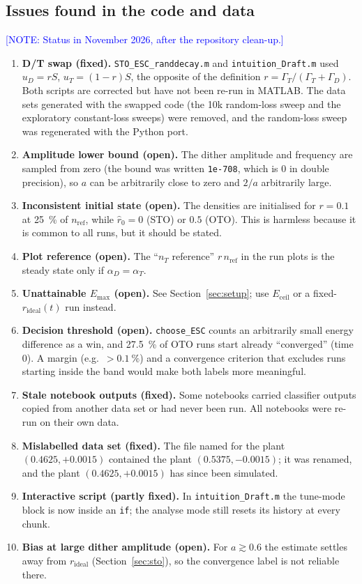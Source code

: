 \documentclass[11pt,a4paper]{article}
\newcommand{\note}[1]{\textcolor{blue}{[NOTE: #1]}}
\newcommand{\nT}{n_T}
\newcommand{\nref}{n_\mathrm{ref}}
\newcommand{\rid}{r_\mathrm{ideal}}
\newcommand{\rhat}{\hat r}
\begin{document}
\subsection{Issues found in the code and data}
\label{sec:issues}
\note{Status in November 2026, after the repository clean-up.}
\begin{enumerate}
  \item \textbf{D/T swap (fixed).} \texttt{STO\_ESC\_randdecay.m} and \texttt{intuition\_Draft.m} used $u_D=rS$, $u_T=(1-r)S$, the opposite of the definition $r=\Gamma_T/(\Gamma_T+\Gamma_D)$. Both scripts are corrected but have not been re-run in MATLAB. The data sets generated with the swapped code (the 10k random-loss sweep and the exploratory constant-loss sweeps) were removed, and the random-loss sweep was regenerated with the Python port.
  \item \textbf{Amplitude lower bound (open).} The dither amplitude and frequency are sampled from zero (the bound was written \texttt{1e-708}, which is $0$ in double precision), so $a$ can be arbitrarily close to zero and $2/a$ arbitrarily large.
  \item \textbf{Inconsistent initial state (open).} The densities are initialised for $r=0.1$ at \SI{25}{\percent} of $\nref$, while $\rhat_0=0$ (STO) or $0.5$ (OTO). This is harmless because it is common to all runs, but it should be stated.
  \item \textbf{Plot reference (open).} The ``$\nT$ reference'' $r\,\nref$ in the run plots is the steady state only if $\alpha_D=\alpha_T$.
  \item \textbf{Unattainable $E_\mathrm{max}$ (open).} See Section~\ref{sec:setup}; use $E_\mathrm{ceil}$ or a fixed-$\rid(t)$ run instead.
  \item \textbf{Decision threshold (open).} \texttt{choose\_ESC} counts an arbitrarily small energy difference as a win, and \SI{27.5}{\percent} of OTO runs start already ``converged'' (time 0). A margin (e.g.\ $>\SI{0.1}{\percent}$) and a convergence criterion that excludes runs starting inside the band would make both labels more meaningful.
  \item \textbf{Stale notebook outputs (fixed).} Some notebooks carried classifier outputs copied from another data set or had never been run. All notebooks were re-run on their own data.
  \item \textbf{Mislabelled data set (fixed).} The file named for the plant $(0.4625,+0.0015)$ contained the plant $(0.5375,-0.0015)$; it was renamed, and the plant $(0.4625,+0.0015)$ has since been simulated.
  \item \textbf{Interactive script (partly fixed).} In \texttt{intuition\_Draft.m} the tune-mode block is now inside an \texttt{if}; the analyse mode still resets its history at every chunk.
  \item \textbf{Bias at large dither amplitude (open).} For $a\gtrsim0.6$ the estimate settles away from $\rid$ (Section~\ref{sec:sto}), so the convergence label is not reliable there.
\end{enumerate}
\end{document}
